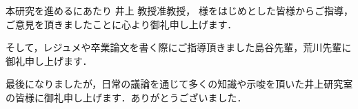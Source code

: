 \theacknowledgments


\begin{comment}
    \textblockcolour{lime}
    \begin{textblock}{12}(6, 6)
        謝辞はなくてもよい。
        
        謝辞・参考文献・ソースコードなどの付録は本文に含まれない。
    \end{textblock}
    
    \begin{textblock}{12}(6, 12)
        論文全体で句読点の形式を統一する。
    
        このサンプルでは謝辞の句読点が他の章のそれと異なっている。
    
        どの句読点形式で執筆をするか指導教員に確認すること。
    \end{textblock}
\end{comment}

本研究を進めるにあたり 井上 教授准教授， 様をはじめとした皆様からご指導，ご意見を頂きましたことに心より御礼申し上げます．

そして，レジュメや卒業論文を書く際にご指導頂きました島谷先輩，荒川先輩に御礼申し上げます．

最後になりましたが，日常の議論を通じて多くの知識や示唆を頂いた井上研究室の皆様に御礼申し上げます．ありがとうございました．
